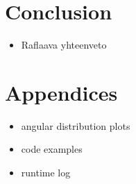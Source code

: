 \section{Conclusion}
\begin{itemize}
\item Raflaava yhteenveto
\end{itemize}

\section{Appendices}
\begin{itemize}
\item angular distribution plots
\item code examples
\item runtime log
\end{itemize}





  









